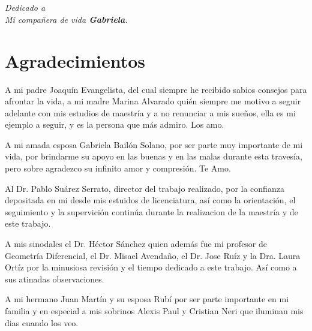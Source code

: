 \documentclass[a4paper,10pt]{book}
\begin{document}
\chapter*{}
\begin{flushright}
\textit{Dedicado a \\
Mi compa\~{n}era de vida {\bfseries Gabriela}.}
\end{flushright}

\chapter*{Agradecimientos} %

A mi padre Joaqu\'in Evangelista, del cual siempre he recibido sabios consejos para afrontar la vida, a mi madre Marina Alvarado qui\'en siempre me motivo a seguir adelante con mis estudios de maestr\'ia y a no renunciar a mis sue\~{n}os, ella es mi ejemplo a seguir, y es la persona que m\'as admiro. Los amo.\\ 

\par A mi amada esposa Gabriela Bail\'on Solano, por ser parte muy importante de mi vida, por brindarme su apoyo en las buenas y en las malas durante esta traves\'ia, pero sobre agradezco su infinito amor y compresi\'on. Te Amo.\\

\par Al Dr. Pablo Su\'arez Serrato, director del trabajo realizado, por la confianza depositada en mi desde mis estuidos de licenciatura, as\'i como la orientaci\'on, el seguimiento y la supervici\'on contin\'ua durante la realizacion de la maestr\'ia y de este trabajo.\\   

\par A mis sinodales el Dr. H\'ector S\'anchez quien adem\'as fue mi profesor de Geometr\'ia Diferencial, el Dr. Misael Avenda\~{n}o, el Dr. Jose Ru\'iz y la Dra. Laura Ort\'iz por la minusiosa revisi\'on y el tiempo dedicado a este trabajo. As\'i como a sus atinadas observaciones.\\    

\par A mi hermano Juan Mart\'in y su esposa Rub\'i por ser parte importante en mi familia y en especial a mis sobrinos Alexis Paul y Cristian Neri que iluminan mis dias cuando los veo.\\     
\end{document}
